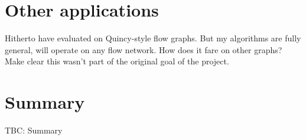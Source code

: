 \section{Other applications}

Hitherto have evaluated on Quincy-style flow graphs. But my algorithms are fully general, will operate on any flow network. How does it fare on other graphs? Make clear this wasn't part of the original goal of the project.

\section{Summary}

TBC: Summary